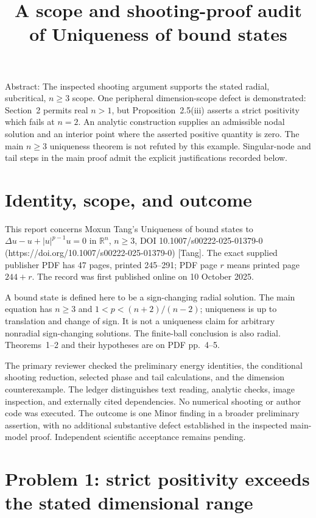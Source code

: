 \documentclass[10pt]{article}
\title{A scope and shooting-proof audit of
Uniqueness of bound states}
\author{}
\date{}
\begin{document}
\maketitle
Abstract: The inspected shooting argument supports the stated radial, subcritical, \(n\ge3\) scope. One peripheral dimension-scope defect is demonstrated: Section 2 permits real \(n>1\), but Proposition 2.5(iii) asserts a strict positivity which fails at \(n=2\). An analytic construction supplies an admissible nodal solution and an interior point where the asserted positive quantity is zero. The main \(n\ge3\) uniqueness theorem is not refuted by this example. Singular-node and tail steps in the main proof admit the explicit justifications recorded below.\par
\section*{Identity, scope, and outcome}
This report concerns Moxun Tang’s Uniqueness of bound states to \(\Delta u-u+|u|^{p-1}u=0\) in \(\mathbb R^n\), \(n\ge3\), DOI 10.1007/s00222-025-01379-0 (https://doi.org/10.1007/s00222-025-01379-0) [Tang]. The exact supplied publisher PDF has 47 pages, printed 245–291; PDF page \(r\) means printed page \(244+r\). The record was first published online on 10 October 2025.\par
A bound state is defined here to be a sign-changing radial solution. The main equation has \(n\ge3\) and \(1<p<(n+2)/(n-2)\); uniqueness is up to translation and change of sign. It is not a uniqueness claim for arbitrary nonradial sign-changing solutions. The finite-ball conclusion is also radial. Theorems 1–2 and their hypotheses are on PDF pp. 4–5.\par
The primary reviewer checked the preliminary energy identities, the conditional shooting reduction, selected phase and tail calculations, and the dimension counterexample. The ledger distinguishes text reading, analytic checks, image inspection, and externally cited dependencies. No numerical shooting or author code was executed. The outcome is one Minor finding in a broader preliminary assertion, with no additional substantive defect established in the inspected main-model proof. Independent scientific acceptance remains pending.\par
\section*{Problem 1: strict positivity exceeds the stated dimensional range}
\end{document}
